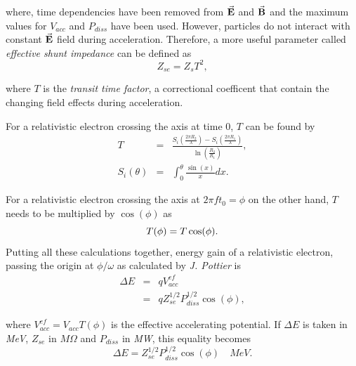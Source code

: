 \documentclass[a4paper,oneside,12pt]{report}
\numberwithin{equation}{chapter}
\begin{document}
\vspace{-30pt}
\noindent
where, time dependencies have been removed from $\vec{\textbf{E}}$ and $\vec{\textbf{B}}$ 
and the maximum values for $V_{acc}$ and $P_{diss}$ have been used. 
However, particles do not interact with constant $\vec{\textbf{E}}$ field during acceleration. 
Therefore, a more useful parameter called \textit{effective shunt impedance} can be defined as
\vspace{-20pt}
\begin{equation}
    Z_{se} = Z_s T^2  ,
\end{equation}

\vspace{-40pt}
\noindent
where $T$ is the \textit{transit time factor}, a correctional coefficent that contain the changing field effects during acceleration.

For a relativistic electron crossing the axis at time 0, $T$ can be found by \cite{rhodo_pottier}
\vspace{-10pt}\begin{eqnarray}
    T &=& \frac{S_i(\frac{2 \pi R_2}{\lambda}) - S_i(\frac{2 \pi R_1}{\lambda})}{\ln(\frac{R_2}{R_1})}   ,\\
    S_i(\theta) &=& \int_0^{\theta} \frac{\sin(x)}{x} dx .
\end{eqnarray}

\vspace{-10pt}
For a relativistic electron crossing the axis at $2\pi f t_0 = \phi$ on the other hand, $T$ needs to be multiplied by $\cos(\phi)$ as
\vspace{-20pt}\begin{equation}
    T(\phi) = T \cos(\phi) .
\vspace{-20pt}\end{equation} 
Putting all these calculations together, energy gain of a relativistic electron, passing the origin at $\phi / \omega$ as calculated by \textit{J. Pottier} is \cite{rhodo_pottier}
\vspace{-18pt}\begin{eqnarray}
    \Delta E &=& q V_{acc}^{ef} \nonumber\\
             &=& q Z_{se}^{1/2}P_{diss}^{1/2} \cos(\phi)  ,
\end{eqnarray}

\vspace{-40pt}
\noindent
where $ V_{acc}^{ef} = V_{acc} T(\phi)$ is the effective accelerating potential.
If $\Delta E$ is taken in \textit{MeV}, $Z_{se}$ in $M\Omega$ and $P_{diss}$ in \textit{MW}, this equality becomes
\vspace{-18pt}
\begin{equation} \label{eq:W_gain_each_pass_pottier}
    \Delta E = Z_{se}^{1/2}P_{diss}^{1/2} \cos(\phi) \quad MeV .
\end{equation}
\end{document}
